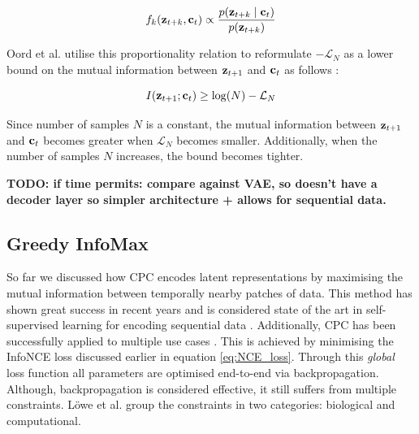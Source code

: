 	\begin{equation}
		f_k(\mathbf{z}_{t+k}, \mathbf{c}_t) \propto \frac{p(\mathbf{z}_{t+k} \mid \mathbf{c}_t)}{p(\mathbf{z}_{t+k})} \label{eq:fkproporational}
	\end{equation}
	
	Oord et al. utilise this proportionality relation to reformulate $-\mathcal{L}_N$ as a lower bound on the mutual information between $\mathbf{z}_{t+1}$ and $\mathbf{c}_t$ as follows \cite{lowePuttingEndEndtoEnd2020, oordRepresentationLearningContrastive2019}:
	
	\begin{equation}
		I(\mathbf{z}_{t+1}; \mathbf{c}_t) \ge \log(N) - \mathcal{L}_N
	\end{equation}

	Since number of samples $N$ is a constant, the mutual information between $\mathbf{z}_{t+1}$ and $\mathbf{c}_t$ becomes greater when $\mathcal{L}_N$ becomes smaller. Additionally, when the number of samples $N$ increases, the bound becomes tighter.
	
			

	\textbf{TODO: if time permits: compare against VAE, so doesn't have a decoder layer so simpler architecture + allows for sequential data.}
	
	

\subsection{Greedy InfoMax}
	So far we discussed how CPC encodes latent representations by maximising the mutual information between temporally nearby patches of data. This method has shown great success in recent years and is considered state of the art in self-supervised learning for encoding sequential data \cite{stackeEvaluationContrastivePredictive2020}. Additionally, CPC has been successfully applied to multiple use cases \cite{stackeEvaluationContrastivePredictive2020, dehaanContrastivePredictiveCoding2021, luSemiSupervisedHistologyClassification2019, bhatiSegmentalContrastivePredictive2021b, deldariTimeSeriesChange2021, henaffDataEfficientImageRecognition2020}. This is achieved by minimising the InfoNCE loss discussed earlier in equation \ref{eq:NCE_loss}. Through this \textit{global} loss function all parameters are optimised end-to-end via backpropagation. Although, backpropagation is considered effective, it still suffers from multiple constraints. Löwe et al. group the constraints in two categories: biological and computational.
	

